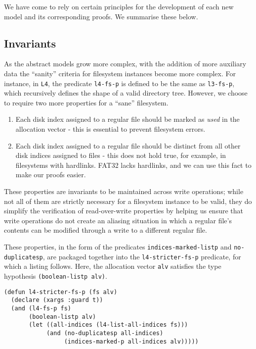 \documentclass[submission,copyright,creativecommons]{eptcs}
\begin{document}
We have come to rely on certain principles for the development of each
new model and its corresponding proofs. We summarise these below.

\subsection{Invariants}
\label{subsec:invariants}

As the abstract models grow more complex, with the addition of more
auxiliary data the ``sanity'' criteria for filesystem instances become more
complex. For instance, in \texttt{L4}, the predicate \texttt{l4-fs-p}
is defined to be the same as \texttt{l3-fs-p}, which recursively
defines the shape of a valid directory tree. However, we choose to
require two more properties for a ``sane'' filesystem.

\begin{enumerate}
\item Each disk index assigned to a regular file should be
  marked as \textit{used} in the allocation vector - this is essential
  to prevent filesystem errors.
\item Each disk index assigned to a regular file should be distinct
  from all other disk indices assigned to files - this does not hold
  true, for example, in filesystems with hardlinks. FAT32 lacks
  hardlinks, and we can use this fact to make our proofs easier.
\end{enumerate}

These properties are invariants to be maintained across
write operations; while not all of them are strictly necessary for a
filesystem instance to be valid, they do simplify the verification of
read-over-write properties by helping us ensure that write operations
do not create an aliasing situation in which a regular file's
contents can be modified through a write to a different regular file.

These properties, in the form of the predicates
\texttt{indices-marked-listp} and \texttt{no-duplicatesp}, are
packaged together into the \texttt{l4-stricter-fs-p} predicate, for
which a listing follows. Here, the allocation vector \texttt{alv}
satisfies the type hypothesis \texttt{(boolean-listp alv)}.

\medskip

\noindent
\begin{verbatim}
(defun l4-stricter-fs-p (fs alv)
  (declare (xargs :guard t))
  (and (l4-fs-p fs)
       (boolean-listp alv)
       (let ((all-indices (l4-list-all-indices fs)))
            (and (no-duplicatesp all-indices)
                 (indices-marked-p all-indices alv)))))
\end{verbatim}
\end{document}
